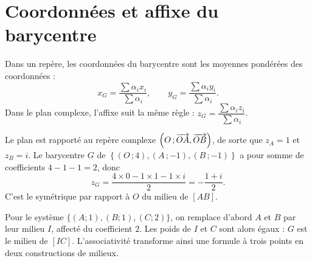 \section{Coordonnées et affixe du barycentre}

\begin{propriete}
Dans un repère, les coordonnées du barycentre sont les moyennes pondérées des
coordonnées :
\[
  x_{G} = \frac{\sum \alpha_{i}x_{i}}{\sum \alpha_{i}},
  \qquad
  y_{G} = \frac{\sum \alpha_{i}y_{i}}{\sum \alpha_{i}} .
\]
Dans le plan complexe, l'affixe suit la même règle :
$z_{G} = \dfrac{\sum \alpha_{i}z_{i}}{\sum \alpha_{i}}$.
\end{propriete}

\begin{exemple}
Le plan est rapporté au repère complexe
$\left(O\,;\overrightarrow{OA},\overrightarrow{OB}\right)$, de sorte que $z_{A} = 1$ et
$z_{B} = i$. Le barycentre $G$ de
$\left\{(O\,;4),(A\,;-1),(B\,;-1)\right\}$ a pour somme de coefficients
$4-1-1 = 2$, donc
\[
  z_{G} = \frac{4 \times 0-1 \times 1-1 \times i}{2} = -\frac{1+i}{2}.
\]
C'est le symétrique par rapport à $O$ du milieu de $[AB]$.
\end{exemple}

\begin{visualisation}
\begin{center}
\end{center}

Pour le système $\{(A;1),(B;1),(C;2)\}$, on remplace d'abord $A$ et $B$
par leur milieu $I$, affecté du coefficient $2$. Les poids de $I$ et $C$
sont alors égaux : $G$ est le milieu de $[IC]$. L'associativité transforme
ainsi une formule à trois points en deux constructions de milieux.
\end{visualisation}

